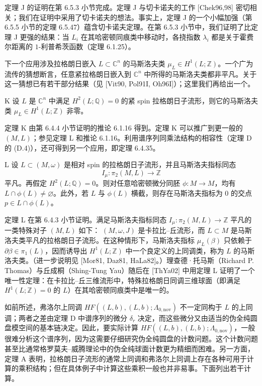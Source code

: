 定理 J 的证明在第 6.5.3 小节完成。定理 J 与切卡诺夫的工作 [Chek96,98] 密切相关；我们在证明中采用了切卡诺夫的想法。事实上，定理 J 的一个小幅加强（第 6.5.5 小节的定理 6.5.47）蕴含切卡诺夫定理。在第 6.5.3 小节中，我们证明了比定理 J 更强的结果：当 $L_i$ 在其哈密顿同痕类中移动时，各挠指数 $\lambda_i$ 都是关于霍费尔距离的 $1$-利普希茨函数（定理 6.1.25）。

下一个应用涉及拉格朗日嵌入 $L\subset\mathbb C^n$ 的马斯洛夫类
$\mu_L\in H^1(L;\mathbb Z)$。一个广为流传的猜想断言，任意紧拉格朗日嵌入到
$\mathbb C^n$ 中所得的马斯洛夫类都非平凡。关于这一猜想已有若干部分结果（见
[Vit90, Pol91I, Oh96I]）；这里我们再给出一个。

\begin{theorem}{K}
设 $L$ 是 $\mathbb C^n$ 中满足 $H^2(L;\mathbb Q)=0$ 的紧 spin 拉格朗日子流形，则它的马斯洛夫类 $\mu_L\in H^1(L;\mathbb Z)$ 非零。
\end{theorem}

定理 K 由第 6.4.4 小节证明的推论 6.1.16 得到。定理 K 可以推广到更一般的
$(M,L)$；参见定理 L 和推论 6.1.16。利用谱序列同乘法结构的相容性（定理 D 的
(D.4)），还可得到另一个应用，即定理 6.4.35。

\begin{theorem}{L}
设 $L\subset(M,\omega)$ 是相对 spin 的拉格朗日子流形，并且马斯洛夫指标同态
\[
  I_\mu:\pi_2(M,L)\longrightarrow\mathbb Z
\]
平凡。再假定 $H^2(L;\mathbb Q)=0$。则对任意哈密顿微分同胚
$\phi:M\to M$，均有 $L\cap\phi(L)\neq\varnothing$。此外，若 $L$ 与
$\phi(L)$ 横截，则存在马斯洛夫指标为 $0$ 的交点
$p\in L\cap\phi(L)$。
\end{theorem}

定理 L 在第 6.4.3 小节证明。满足马斯洛夫指标同态
$I_\mu:\pi_2(M,L)\to\mathbb Z$ 平凡的一类特殊对子 $(M,L)$ 如下：
$(M,\omega,J)$ 是卡拉比--丘流形，而 $L\subset M$ 是马斯洛夫类平凡的拉格朗日子流形。在这种情形下，马斯洛夫指标 $\mu_L(\beta)$ 只依赖于
$\partial\beta\in\pi_1(L)$，因而诱导出 $H^1(L;\mathbb Z)$ 中一个良定义的上同调类，称为 $L$ 的马斯洛夫类。（进一步说明见 [Mor81, Daz81, HaLa82]。）理查德·托马斯（Richard P. Thomas）与丘成桐（Shing-Tung Yau）随后在 [ThYa02] 中用定理 L 证明了一个唯一性定理：在卡拉比--丘三维流形中，特殊拉格朗日同调三维球面（即满足 $H^1(L;\mathbb Z)=0$ 的 $L$）在其哈密顿同痕类中是唯一的。

如前所述，弗洛尔上同调
$HF((L,b),(L,b);\Lambda_{0,\mathrm{nov}})$ 不一定同构于 $L$ 的上同调；两者之差由定理 D 中谱序列的微分 $\delta_r$ 决定，而这些微分又由适当的伪全纯圆盘模空间的基本链决定。因此，要实际计算
$HF((L,b),(L,b);\Lambda_{0,\mathrm{nov}})$，一般很难分析这个谱序列，因为这需要仔细研究伪全纯圆盘的计数问题。这个计数问题甚至比通常格罗莫夫--威腾理论中的伪全纯球面计数更为精细而困难。另一方面，定理 A 表明，拉格朗日子流形的通常上同调和弗洛尔上同调上存在各种可用于计算的乘积结构；但在具体例子中计算这些乘积一般也并非易事。下面列出若干计算。

